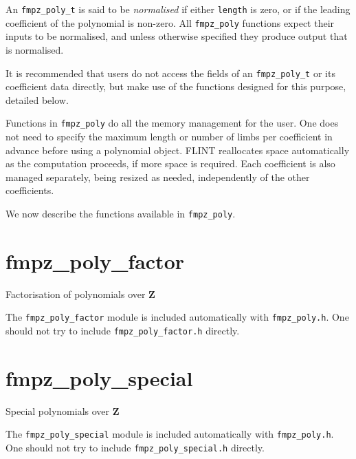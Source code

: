 \documentclass[a4paper,10pt]{book}
\newcommand{\Z}{\mathbf{Z}}%
\newcommand{\code}{\lstinline}
\begin{document}
{{An \code{fmpz_poly_t} is said to be \emph{normalised} if either
\code{length} is zero, or if the leading coefficient of the polynomial is
non-zero.  All \code{fmpz_poly} functions expect their inputs to be
normalised, and unless otherwise specified they produce output that is
normalised.

It is recommended that users do not access the fields of an
\code{fmpz_poly_t} or its coefficient data directly, but make use of the
functions designed for this purpose, detailed below.

Functions in \code{fmpz_poly} do all the memory management for the user.
One does not need to specify the maximum length or number of limbs per
coefficient in advance before using a polynomial object.  FLINT reallocates
space automatically as the computation proceeds, if more space is required.
Each coefficient is also managed separately, being resized as needed,
independently of the other coefficients.

We now describe the functions available in \code{fmpz_poly}.




\chapter{fmpz\_poly\_factor}
\epigraph{Factorisation of polynomials over $\Z$}{}

The \code{fmpz_poly_factor} module is included automatically with
\code{fmpz_poly.h}. One should not try to include \code{fmpz_poly_factor.h}
directly.




\chapter{fmpz\_poly\_special}
\epigraph{Special polynomials over $\Z$}{}

The \code{fmpz_poly_special} module is included automatically with
\code{fmpz_poly.h}. One should not try to include \code{fmpz_poly_special.h}
directly.

}}
\end{document}
